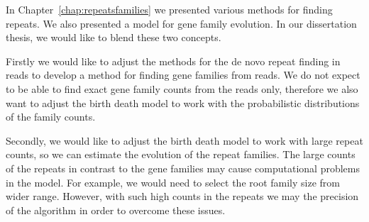 In Chapter~\ref{chap:repeatsfamilies} we presented various methods for finding repeats. We also presented a model for gene family evolution.
In our dissertation thesis, we would like to blend these two concepts.

Firstly we would like to adjust the methods for the de novo repeat finding in reads to develop a method for finding gene families from reads.
We do not expect to be able to find exact gene family counts from the reads only, therefore we also want to adjust the birth death model to work with the probabilistic distributions of the family counts.

Secondly, we would like to adjust the birth death model to work with large repeat counts, so we can estimate the evolution of the repeat families. The large counts of the repeats in contrast to the gene families may cause computational problems in the model. For example, we would need to select the root family size from wider range.
However, with such high counts in the repeats we may  the precision of the algorithm in order to overcome these issues.
